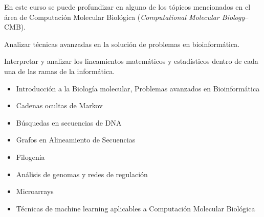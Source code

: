 \begin{syllabus}


\begin{justification}
En este curso se puede profundizar en alguno de los tópicos
mencionados en el área de Computación Molecular Biológica (\textit{Computational Molecular Biology}--CMB).\nocite{dav01,pav04,pete00}
\end{justification}

\begin{goals}
\item Analizar técnicas avanzadas en la solución de problemas en bioinformática.
\item Interpretar y analizar los lineamientos matemáticos y estadísticos dentro de cada una de las ramas de la informática.
\end{goals}

\begin{outcomes}
\end{outcomes}

\begin{itemize}
\item Introducción a la Biología molecular, Problemas avanzados en Bioinformática
\item Cadenas ocultas de Markov
\item Búsquedas en secuencias de DNA
\item Grafos en Alineamiento de Secuencias
\item Filogenia
\item Análisis de genomas y redes de regulación
\item Microarrays
\item Técnicas de machine learning aplicables a Computación Molecular Biológica
\end{itemize}



\begin{coursebibliography}
\end{coursebibliography}

\end{syllabus}

